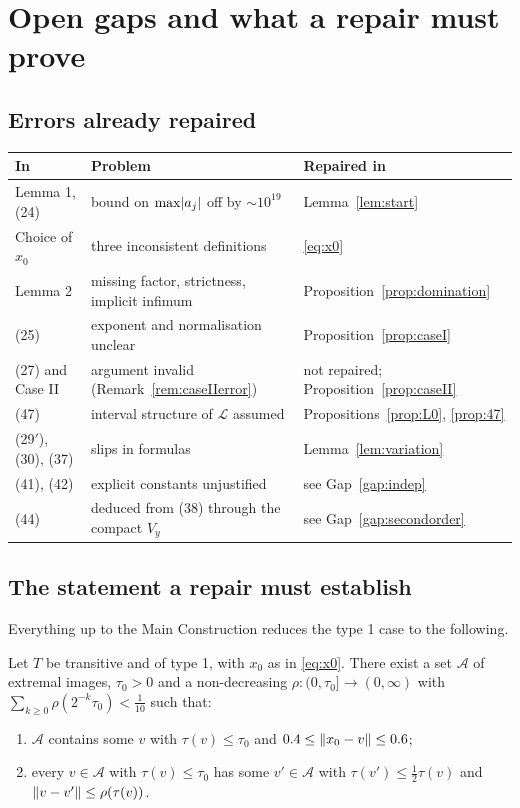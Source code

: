 \section{Open gaps and what a repair must prove}\label{sec:gaps}

\subsection{Errors already repaired}
\begin{center}
\small
\begin{tabularx}{\textwidth}{@{}l>{\raggedright\arraybackslash}Xl@{}}
\toprule
In \paper{} & Problem & Repaired in\\
\midrule
Lemma 1, (24) & bound on $\max\lvert a_j\rvert$ off by $\sim10^{19}$ & Lemma~\ref{lem:start}\\
Choice of $x_0$ & three inconsistent definitions & \eqref{eq:x0}\\
Lemma 2 & missing factor, strictness, implicit infimum & Proposition~\ref{prop:domination}\\
(25) & exponent and normalisation unclear & Proposition~\ref{prop:caseI}\\
(27) and Case II & argument invalid (Remark~\ref{rem:caseIIerror}) & not repaired; Proposition~\ref{prop:caseII}\\
(47) & interval structure of $\mathcal L$ assumed & Propositions~\ref{prop:L0}, \ref{prop:47}\\
(29$'$), (30), (37) & slips in formulas & Lemma~\ref{lem:variation}\\
(41), (42) & explicit constants unjustified & see Gap~\ref{gap:indep}\\
(44) & deduced from (38) through the compact $V_y$ & see Gap~\ref{gap:secondorder}\\
\bottomrule
\end{tabularx}
\end{center}

\subsection{The statement a repair must establish}
Everything up to the Main Construction reduces the type 1 case to the following.

\begin{target}\label{target:lip}\stopen{}
Let $T$ be transitive and of type 1, with $x_0$ as in \eqref{eq:x0}. There exist a set
$\mathcal A$ of extremal images, $\tau_0>0$ and a non-decreasing $\rho:(0,\tau_0]\to(0,\infty)$ with
$\sum_{k\ge0}\rho(2^{-k}\tau_0)<\frac1{10}$ such that:
\begin{enumerate}[label=(\alph*)]
\item $\mathcal A$ contains some $v$ with $\tau(v)\le\tau_0$ and
$0.4\le\lVert x_0-v\rVert\le0.6$;
\item every $v\in\mathcal A$ with $\tau(v)\le\tau_0$ has some $v'\in\mathcal A$ with
$\tau(v')\le\frac12\tau(v)$ and $\lVert v-v'\rVert\le\rho(\tau(v))$.
\end{enumerate}
\end{target}

